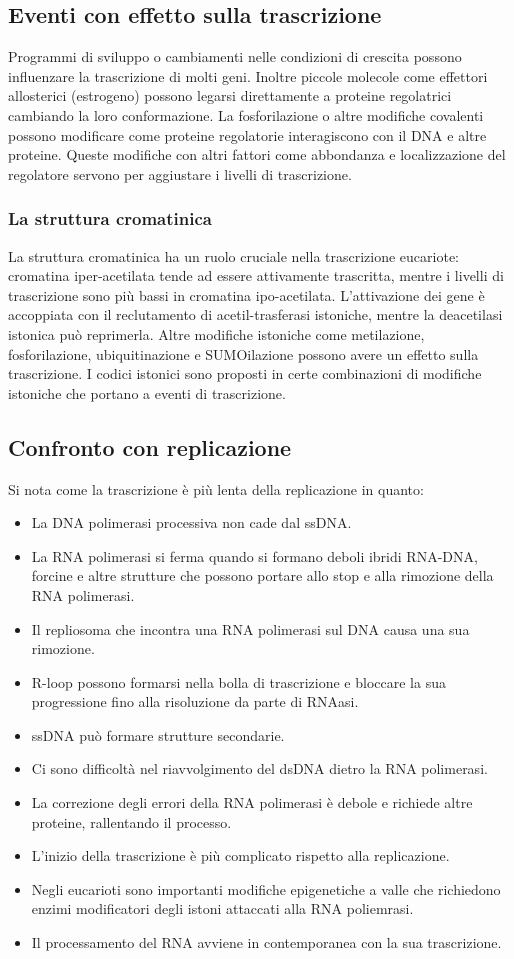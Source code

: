 \subsection{Eventi con effetto sulla trascrizione}
Programmi di sviluppo o cambiamenti nelle condizioni di crescita possono influenzare la trascrizione di molti geni. Inoltre piccole molecole come effettori allosterici (estrogeno) 
possono legarsi direttamente a proteine regolatrici cambiando la loro conformazione. La fosforilazione o altre modifiche covalenti possono modificare come proteine regolatorie
interagiscono con il DNA e altre proteine. Queste modifiche con altri fattori come abbondanza e localizzazione del regolatore servono per aggiustare i livelli di trascrizione.
\subsubsection{La struttura cromatinica}
La struttura cromatinica ha un ruolo cruciale nella trascrizione eucariote: cromatina iper-acetilata tende ad essere attivamente trascritta, mentre i livelli di trascrizione sono pi\`u
bassi in cromatina ipo-acetilata. L'attivazione dei gene \`e accoppiata con il reclutamento di acetil-trasferasi istoniche, mentre la deacetilasi istonica pu\`o reprimerla. Altre
modifiche istoniche come metilazione, fosforilazione, ubiquitinazione e SUMOilazione possono avere un effetto sulla trascrizione. I codici istonici sono proposti in certe combinazioni
di modifiche istoniche che portano a eventi di trascrizione. 
\subsection{Confronto con replicazione}
Si nota come la trascrizione \`e pi\`u lenta della replicazione in quanto:
\begin{itemize}
	\item La DNA polimerasi processiva non cade dal ssDNA.
	\item La RNA polimerasi si ferma quando si formano deboli ibridi RNA-DNA, forcine e altre strutture che possono portare allo stop e alla rimozione della RNA polimerasi.
	\item Il repliosoma che incontra una RNA polimerasi sul DNA causa una sua rimozione.
	\item R-loop possono formarsi nella bolla di trascrizione e bloccare la sua progressione fino alla risoluzione da parte di RNAasi.
	\item ssDNA pu\`o formare strutture secondarie. 
	\item Ci sono difficolt\`a nel riavvolgimento del dsDNA dietro la RNA polimerasi.
	\item La correzione degli errori della RNA polimerasi \`e debole e richiede altre proteine, rallentando il processo.
	\item L'inizio della trascrizione \`e pi\`u complicato rispetto alla replicazione.
	\item Negli eucarioti sono importanti modifiche epigenetiche a valle che richiedono enzimi modificatori degli istoni attaccati alla RNA poliemrasi.
	\item Il processamento del RNA avviene in contemporanea con la sua trascrizione. 
\end{itemize}
